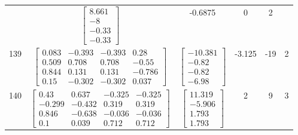 \documentclass[a4paper,12pt]{article}
\begin{document}
\begin{tabular}{c c c c c c}
&
$\begin{bmatrix} 8.661 \\ -8 \\ -0.33 \\ -0.33 \end{bmatrix}$
&
-0.6875
&
0
&
2
\\
139
&
$\begin{bmatrix} 0.083 & -0.393 & -0.393 & 0.28 \\ 0.509 & 0.708 & 0.708 & -0.55 \\ 0.844 & 0.131 & 0.131 & -0.786 \\ 0.15 & -0.302 & -0.302 & 0.037 \end{bmatrix}$
&
$\begin{bmatrix} -10.381 \\ -0.82 \\ -0.82 \\ -6.98 \end{bmatrix}$
&
-3.125
&
-19
&
2
\\
140
&
$\begin{bmatrix} 0.43 & 0.637 & -0.325 & -0.325 \\ -0.299 & -0.432 & 0.319 & 0.319 \\ 0.846 & -0.638 & -0.036 & -0.036 \\ 0.1 & 0.039 & 0.712 & 0.712 \end{bmatrix}$
&
$\begin{bmatrix} 11.319 \\ -5.906 \\ 1.793 \\ 1.793 \end{bmatrix}$
&
2
&
9
&
3
\\
\end{tabular} \egroup \newpage
\end{document}
